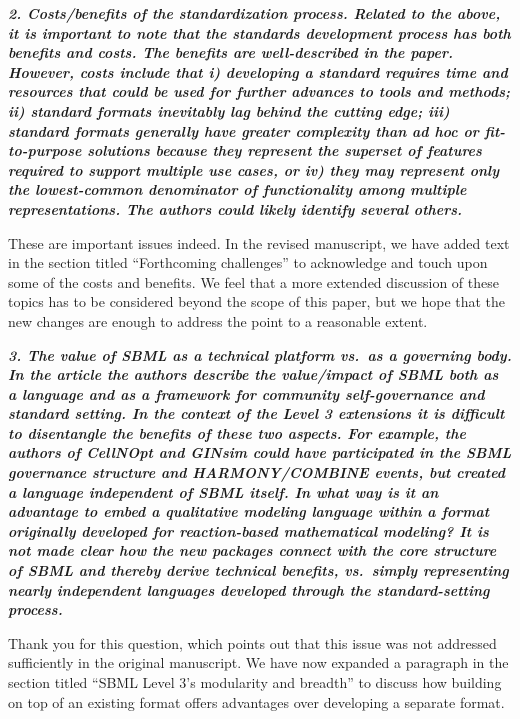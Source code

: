 \documentclass[11pt]{mhletter}
\begin{document}
\textbf{\textit{2. Costs/benefits of the standardization process. Related to the above, it is important to note that the standards development process has both benefits and costs. The benefits are well-described in the paper. However, costs include that i) developing a standard requires time and resources that could be used for further advances to tools and methods; ii) standard formats inevitably lag behind the cutting edge; iii) standard formats generally have greater complexity than ad hoc or fit-to-purpose solutions because they represent the superset of features required to support multiple use cases, or iv) they may represent only the lowest-common denominator of functionality among multiple representations. The authors could likely identify several others.}}

These are important issues indeed.  In the revised manuscript, we have added text in the section titled ``Forthcoming challenges'' to acknowledge and touch upon some of the costs and benefits.  We feel that a more extended discussion of these topics has to be considered beyond the scope of this paper, but we hope that the new changes are enough to address the point to a reasonable extent.


\textbf{\textit{3. The value of SBML as a technical platform vs.\ as a governing body.  In the article the authors describe the value/impact of SBML both as a language and as a framework for community self-governance and standard setting. In the context of the Level 3 extensions it is difficult to disentangle the benefits of these two aspects. For example, the authors of CellNOpt and GINsim could have participated in the SBML governance structure and HARMONY/COMBINE events, but created a language independent of SBML itself. In what way is it an advantage to embed a qualitative modeling language within a format originally developed for reaction-based mathematical modeling? It is not made clear how the new packages connect with the core structure of SBML and thereby derive technical benefits, vs.\ simply representing nearly independent languages developed through the standard-setting process.}}

Thank you for this question, which points out that this issue was not addressed sufficiently in the original manuscript.  We have now expanded a paragraph in the section titled ``SBML Level 3's modularity and breadth'' to discuss how building on top of an existing format offers advantages over developing a separate format.
\end{document}
